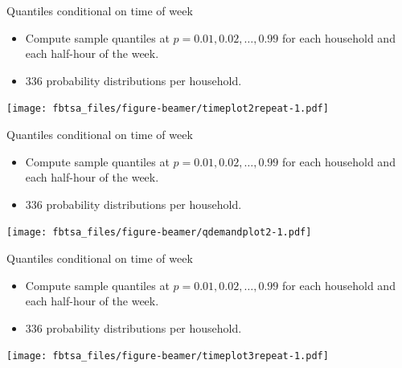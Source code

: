 \documentclass[14pt,ignorenonframetext,]{beamer}
\providecommand{\tightlist}{%
  \setlength{\itemsep}{0pt}\setlength{\parskip}{0pt}}
\begin{document}
\begin{frame}{Quantiles conditional on time of week}
\protect\hypertarget{quantiles-conditional-on-time-of-week-3}{}

\fontsize{11}{13}\sf

\begin{itemize}
\tightlist
\item
  Compute sample quantiles at \(p=0.01,0.02,\dots, 0.99\) for each
  household and each half-hour of the week.
\item
  \(336\) probability distributions per household.
\end{itemize}

\texttt{[image: fbtsa\_files/figure-beamer/timeplot2repeat-1.pdf]}

\end{frame}

\begin{frame}{Quantiles conditional on time of week}
\protect\hypertarget{quantiles-conditional-on-time-of-week-4}{}

\fontsize{11}{13}\sf

\begin{itemize}
\tightlist
\item
  Compute sample quantiles at \(p=0.01,0.02,\dots, 0.99\) for each
  household and each half-hour of the week.
\item
  \(336\) probability distributions per household.
\end{itemize}

\texttt{[image: fbtsa\_files/figure-beamer/qdemandplot2-1.pdf]}

\end{frame}

\begin{frame}{Quantiles conditional on time of week}
\protect\hypertarget{quantiles-conditional-on-time-of-week-5}{}

\fontsize{11}{13}\sf

\begin{itemize}
\tightlist
\item
  Compute sample quantiles at \(p=0.01,0.02,\dots, 0.99\) for each
  household and each half-hour of the week.
\item
  \(336\) probability distributions per household.
\end{itemize}

\texttt{[image: fbtsa\_files/figure-beamer/timeplot3repeat-1.pdf]}

\end{frame}
\end{document}
